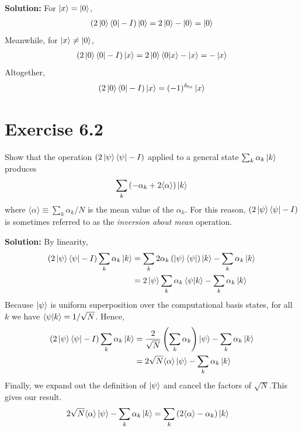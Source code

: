 \documentclass{book}
\begin{document}
    \textbf{Solution:} For $\ket{x} = \ket{0}$,
    \begin{align}
        (2\ket{0}\bra{0}-I)\ket{0} = 2\ket{0}-\ket{0} = \ket{0}
    \end{align}
    Meanwhile, for $\ket{x} \neq \ket{0}$,
    \begin{align}
        (2\ket{0}\bra{0}-I)\ket{x} = 2\ket{0}\braket{0}{x}-\ket{x} = -\ket{x}
    \end{align}
    Altogether,
    \begin{align}
        (2\ket{0}\bra{0}-I)\ket{x} = (-1)^{\delta_{0x}}\ket{x}
    \end{align}

\section*{Exercise 6.2}
    Show that the operation $(2\ket{\psi}\bra{\psi}-I)$ applied to a general state $\sum_k \alpha_k \ket{k}$ produces
    \begin{align}
        \sum_k \left(-\alpha_k+2\langle\alpha\rangle\right)\ket{k}
    \end{align}
    where $\langle\alpha\rangle \equiv \sum_k\alpha_k/N$ is the mean value of the $\alpha_k$. For this reason, $(2\ket{\psi}\bra{\psi}-I)$ is sometimes referred to as the \emph{inversion about mean} operation.
    
    \textbf{Solution:} By linearity,
    \begin{align*}
        (2\ket{\psi}\bra{\psi}-I)\sum_k \alpha_k\ket{k} &= \sum_k 2 \alpha_k\left(\ket{\psi}\bra{\psi}\right)\ket{k} - \sum_k \alpha_k\ket{k} \\
        &= 2\ket{\psi}\sum_k\alpha_k\braket{\psi}{k}-\sum_k\alpha_k\ket{k}
    \end{align*}
    Because $\ket{\psi}$ is uniform superposition over the computational basis states, for all $k$ we have $\braket{\psi}{k}=1/\sqrt{N}$. Hence,
    \begin{align}
    (2\ket{\psi}\bra{\psi}-I)\sum_k \alpha_k\ket{k} &= \frac{2}{\sqrt{N}}\left(\sum_k\alpha_k\right)\ket{\psi} - \sum_k \alpha_k\ket{k} \\
    &= 2\sqrt{N} \langle\alpha\rangle\ket{\psi} - \sum_k\alpha_k\ket{k}
    \end{align}
    Finally, we expand out the definition of $\ket{\psi}$ and cancel the factors of $\sqrt{N}$.This gives our result. 
    \begin{align}
        2\sqrt{N} \langle\alpha\rangle\ket{\psi} - \sum_k\alpha_k\ket{k} &= \sum_k\left(2\langle\alpha\rangle-\alpha_k\right)\ket{k}
    \end{align}
\end{document}
